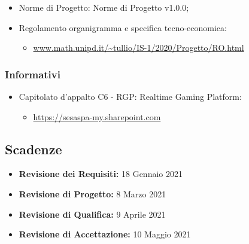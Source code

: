 		\begin{itemize}
			\item Norme di Progetto: Norme di Progetto v1.0.0;
			\item Regolamento organigramma e specifica tecno-economica:
			\begin{itemize}
				\item[] \url{www.math.unipd.it/~tullio/IS-1/2020/Progetto/RO.html}
			\end{itemize}
		\end{itemize}

	\subsubsection{Informativi}
	
		\begin{itemize}
			\item Capitolato d’appalto C6 - RGP: Realtime Gaming Platform:
			\begin{itemize}
				\item[]\href{https://sesaspa-my.sharepoint.com/personal/s_dindo_vargroup_it/_layouts/15/onedrive.aspx?id=%2Fpersonal%2Fs%5Fdindo%5Fvargroup%5Fit%2FDocuments%2FDownload%2Fupload%2FIngegneria%5Fsoftware%2FCapitolato%5FIngegneria%5Fsoftware%2Epdf&parent=%2Fpersonal%2Fs%5Fdindo%5Fvargroup%5Fit%2FDocuments%2FDownload%2Fupload%2FIngegneria%5Fsoftware&originalPath=aHR0cHM6Ly9zZXNhc3BhLW15LnNoYXJlcG9pbnQuY29tLzpiOi9nL3BlcnNvbmFsL3NfZGluZG9fdmFyZ3JvdXBfaXQvRVRodmF5MGY2S1ZDb1h5ZFlPY2UybGtCdC1NWWNuVzF5YWZSWEZYVklPSXNIZz9ydGltZT0zUmc2b0kybTJFZw}{https://sesaspa-my.sharepoint.com}
			\end{itemize}
		\end{itemize}


\subsection{Scadenze}
	
	\begin{itemize}
		\item \textbf{Revisione dei Requisiti:}  18 Gennaio 2021
		\item \textbf{Revisione di Progetto:}  8 Marzo 2021
		\item \textbf{Revisione di Qualifica:} 9 Aprile 2021
		\item \textbf{Revisione di Accettazione:} 10 Maggio 2021
	\end{itemize}


\newpage